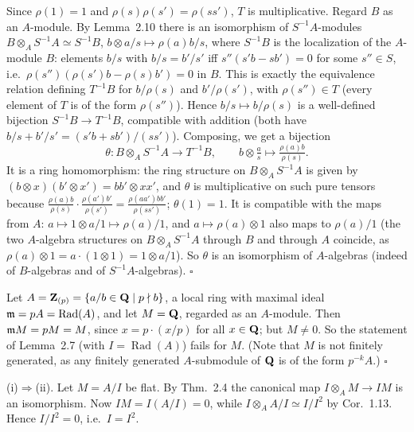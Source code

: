 \documentclass[11pt]{article}
\begin{document}
\pf
Since $\rho(1)=1$ and $\rho(s)\rho(s')=\rho(ss')$, $T$ is multiplicative. Regard $B$ as an $A$-module. By Lemma~2.10 there is an isomorphism of $S^{-1}A$-modules $B\otimes_AS^{-1}A\simeq S^{-1}B$, $b\otimes a/s\mapsto \rho(a)b/s$, where $S^{-1}B$ is the localization of the $A$-module $B$: elements $b/s$ with $b/s=b'/s'$ iff $s''(s'b-sb')=0$ for some $s''\in S$, i.e.\ $\rho(s'')(\rho(s')b-\rho(s)b')=0$ in $B$. This is exactly the equivalence relation defining $T^{-1}B$ for $b/\rho(s)$ and $b'/\rho(s')$, with $\rho(s'')\in T$ (every element of $T$ is of the form $\rho(s'')$). Hence $b/s\mapsto b/\rho(s)$ is a well-defined bijection $S^{-1}B\to T^{-1}B$, compatible with addition (both have $b/s+b'/s'=(s'b+sb')/(ss')$). Composing, we get a bijection
\[ \theta: B\otimes_AS^{-1}A\to T^{-1}B,\qquad b\otimes \tfrac as\mapsto \tfrac{\rho(a)b}{\rho(s)}. \]
It is a ring homomorphism: the ring structure on $B\otimes_AS^{-1}A$ is given by $(b\otimes x)(b'\otimes x')=bb'\otimes xx'$, and $\theta$ is multiplicative on such pure tensors because $\frac{\rho(a)b}{\rho(s)}\cdot\frac{\rho(a')b'}{\rho(s')}=\frac{\rho(aa')bb'}{\rho(ss')}$; $\theta(1)=1$. It is compatible with the maps from $A$: $a\mapsto 1\otimes a/1\mapsto \rho(a)/1$, and $a\mapsto \rho(a)\otimes1$ also maps to $\rho(a)/1$ (the two $A$-algebra structures on $B\otimes_AS^{-1}A$ through $B$ and through $A$ coincide, as $\rho(a)\otimes 1=a\cdot(1\otimes1)=1\otimes a/1$). So $\theta$ is an isomorphism of $A$-algebras (indeed of $B$-algebras and of $S^{-1}A$-algebras). \hfill$\square$

\pf
Let $A=\mathbf Z_{(p)}=\{a/b\in\mathbf Q\mid p\nmid b\}$, a local ring with maximal ideal $\mathfrak m=pA=\operatorname{Rad}(A)$, and let $M=\mathbf Q$, regarded as an $A$-module. Then $\mathfrak m M=pM=M$, since $x=p\cdot(x/p)$ for all $x\in\mathbf Q$; but $M\neq0$. So the statement of Lemma~2.7 (with $I=\operatorname{Rad}(A)$) fails for $M$. (Note that $M$ is not finitely generated, as any finitely generated $A$-submodule of $\mathbf Q$ is of the form $p^{-k}A$.) \hfill$\square$

\pf
(i)$\Rightarrow$(ii). Let $M=A/I$ be flat. By Thm.~2.4 the canonical map $I\otimes_AM\to IM$ is an isomorphism. Now $IM=I(A/I)=0$, while $I\otimes_AA/I\simeq I/I^2$ by Cor.~1.13. Hence $I/I^2=0$, i.e.\ $I=I^2$.
\end{document}
